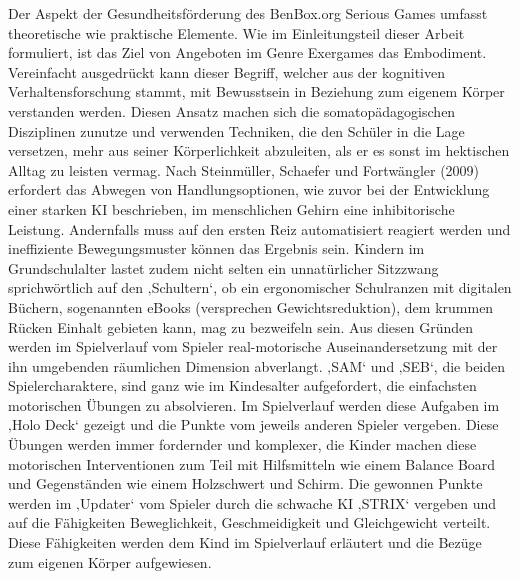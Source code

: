 \documentclass[
  a4paper,
  DIV=11,
  numbers=noendperiod,
  onecolumn,
  oneside,
  a4paper]{scrartcl}
\begin{document}
Der Aspekt der Gesundheitsförderung des BenBox.org Serious Games umfasst
theoretische wie praktische Elemente. Wie im Einleitungsteil dieser
Arbeit formuliert, ist das Ziel von Angeboten im Genre Exergames das
Embodiment. Vereinfacht ausgedrückt kann dieser Begriff, welcher aus der
kognitiven Verhaltensforschung stammt, mit Bewusstsein in Beziehung zum
eigenem Körper verstanden werden. Diesen Ansatz machen sich die
somatopädagogischen Disziplinen zunutze und verwenden Techniken, die den
Schüler in die Lage versetzen, mehr aus seiner Körperlichkeit
abzuleiten, als er es sonst im hektischen Alltag zu leisten vermag. Nach
Steinmüller, Schaefer und Fortwängler (2009) erfordert das Abwegen von
Handlungsoptionen, wie zuvor bei der Entwicklung einer starken KI
beschrieben, im menschlichen Gehirn eine inhibitorische Leistung.
Andernfalls muss auf den ersten Reiz automatisiert reagiert werden und
ineffiziente Bewegungsmuster können das Ergebnis sein. Kindern im
Grundschulalter lastet zudem nicht selten ein unnatürlicher Sitzzwang
sprichwörtlich auf den ‚Schultern`, ob ein ergonomischer Schulranzen mit
digitalen Büchern, sogenannten eBooks (versprechen Gewichtsreduktion),
dem krummen Rücken Einhalt gebieten kann, mag zu bezweifeln sein. Aus
diesen Gründen werden im Spielverlauf vom Spieler real-motorische
Auseinandersetzung mit der ihn umgebenden räumlichen Dimension
abverlangt. ‚SAM` und ‚SEB`, die beiden Spielercharaktere, sind ganz wie
im Kindesalter aufgefordert, die einfachsten motorischen Übungen zu
absolvieren. Im Spielverlauf werden diese Aufgaben im ‚Holo Deck`
gezeigt und die Punkte vom jeweils anderen Spieler vergeben. Diese
Übungen werden immer fordernder und komplexer, die Kinder machen diese
motorischen Interventionen zum Teil mit Hilfsmitteln wie einem Balance
Board und Gegenständen wie einem Holzschwert und Schirm. Die gewonnen
Punkte werden im ‚Updater` vom Spieler durch die schwache KI ‚STRIX`
vergeben und auf die Fähigkeiten Beweglichkeit, Geschmeidigkeit und
Gleichgewicht verteilt. Diese Fähigkeiten werden dem Kind im
Spielverlauf erläutert und die Bezüge zum eigenen Körper aufgewiesen.
\end{document}
